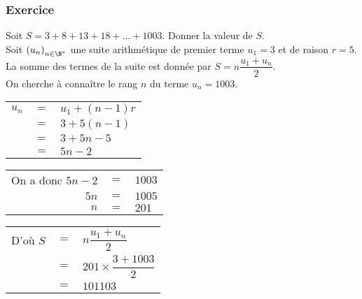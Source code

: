 \newpage

\vspace*{-1.5cm} 

\subsubsection{Exercice }

Soit $S = 3 + 8 + 13 + 18 + ... + 1003$. Donner la valeur de $S$. \\

Soit $\left(u_n\right)_{n \in \N^*}$ une suite arithmétique de premier terme $u_1 = 3$ et de raison $r = 5$. \\

La somme des termes de la suite est donnée par $S = n\dfrac{u_1+u_n}{2}$. \\

On cherche à connaître le rang $n$ du terme $u_n = 1003$. \\


\begin{tabular}{lll}
$u_n$ & $=$ & $ u_1 + \left(n-1\right)r$ \\
& $=$ & $3 + 5\left(n-1\right)$ \\
& $=$ & $3 + 5n - 5$ \\
& $=$ & $5n - 2$ \\
\end{tabular}

\vspace*{.3cm}

\begin{tabular}{rll}
On a donc $5n - 2$ & $=$ & $1003$ \\
$5n$ & $=$ &$1005$ \\
$n$ & $=$ & $201$ \\ 
\end{tabular}

\vspace*{.3cm}

\begin{tabular}{lll}
D'où $S$ & $=$ & $n\dfrac{u_1+u_n}{2}$ \vspace*{.3cm} \\
& $=$ & $201 \times \dfrac{3 + 1003}{2}$ \vspace*{.3cm} \\
& $=$ & $101 103$ \\
\end{tabular}

\vspace*{.3cm}

